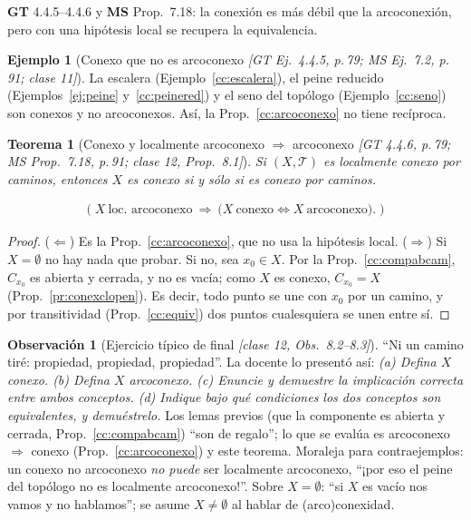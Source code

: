 \documentclass[11pt,a4paper]{article}
\newcommand{\lgc}[1]{\par\vspace{-3pt}\begin{gather*}\big(\;#1\;\big)\end{gather*}\vspace{-6pt}}
\theoremstyle{definition}
\newtheorem{ejemplo}[definicion]{Ejemplo}
\newtheorem{observacion}[definicion]{Observación}
\theoremstyle{plain}
\newtheorem{teorema}[definicion]{Teorema}
\newcommand{\fnt}[1]{{\normalfont\small\itshape\color{gray!150!black}[#1]}}
\newcommand{\tp}{\mathcal{T}}
\begin{document}
\noindent \textbf{GT} 4.4.5--4.4.6 y \textbf{MS} Prop.\ 7.18: la conexión es más débil que la arcoconexión, pero con una hipótesis local se recupera la equivalencia.

\begin{ejemplo}[Conexo que no es arcoconexo \fnt{GT Ej.\ 4.4.5, p.\,79; MS Ej.\ 7.2, p.\,91; clase 11}]
La escalera (Ejemplo~\ref{cc:escalera}), el peine reducido (Ejemplos~\ref{ej:peine} y~\ref{cc:peinered}) y el seno del topólogo (Ejemplo~\ref{cc:seno}) son conexos y no arcoconexos. Así, la Prop.~\ref{cc:arcoconexo} no tiene recíproca.
\end{ejemplo}

\begin{teorema}[Conexo y localmente arcoconexo $\Rightarrow$ arcoconexo \fnt{GT 4.4.6, p.\,79; MS Prop.\ 7.18, p.\,91; clase 12, Prop.\ 8.1}]\label{cc:conexlocarco}
Si $(X,\tp)$ es localmente conexo por caminos, entonces $X$ es conexo si y sólo si es conexo por caminos.
\lgc{X\ \text{loc.\ arcoconexo}\ \Rightarrow\ \big(X\ \text{conexo}\iff X\ \text{arcoconexo}\big).}
\end{teorema}

\begin{proof}
($\Leftarrow$) Es la Prop.~\ref{cc:arcoconexo}, que no usa la hipótesis local.
($\Rightarrow$) Si $X=\emptyset$ no hay nada que probar. Si no, sea $x_0\in X$. Por la Prop.~\ref{cc:compabcam}, $C_{x_0}$ es abierta y cerrada, y no es vacía; como $X$ es conexo, $C_{x_0}=X$ (Prop.~\ref{pr:conexclopen}). Es decir, todo punto se une con $x_0$ por un camino, y por transitividad (Prop.~\ref{cc:equiv}) dos puntos cualesquiera se unen entre sí.
\end{proof}

\begin{observacion}[Ejercicio típico de final \fnt{clase 12, Obs.\ 8.2--8.3}]
``Ni un camino tiré: propiedad, propiedad, propiedad''. La docente lo presentó así: \emph{(a) Defina $X$ conexo. (b) Defina $X$ arcoconexo. (c) Enuncie y demuestre la implicación correcta entre ambos conceptos. (d) Indique bajo qué condiciones los dos conceptos son equivalentes, y demuéstrelo.} Los lemas previos (que la componente es abierta y cerrada, Prop.~\ref{cc:compabcam}) ``son de regalo''; lo que se evalúa es arcoconexo $\Rightarrow$ conexo (Prop.~\ref{cc:arcoconexo}) y este teorema. Moraleja para contraejemplos: un conexo no arcoconexo \emph{no puede} ser localmente arcoconexo, ``¡por eso el peine del topólogo no es localmente arcoconexo!''. Sobre $X=\emptyset$: ``si $X$ es vacío nos vamos y no hablamos''; se asume $X\ne\emptyset$ al hablar de (arco)conexidad.
\end{observacion}
\end{document}

